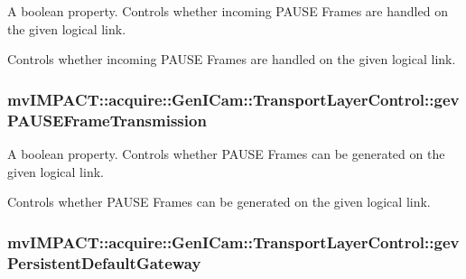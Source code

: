 A boolean property. Controls whether incoming P\+A\+U\+S\+E Frames are handled on the given logical link. 

Controls whether incoming P\+A\+U\+S\+E Frames are handled on the given logical link. \hypertarget{classmv_i_m_p_a_c_t_1_1acquire_1_1_gen_i_cam_1_1_transport_layer_control_a08688eb9f572aa6a47470b2371a45e43}{
\subsubsection[{gev\+P\+A\+U\+S\+E\+Frame\+Transmission}]{ mv\+I\+M\+P\+A\+C\+T\+::acquire\+::\+Gen\+I\+Cam\+::\+Transport\+Layer\+Control\+::gev\+P\+A\+U\+S\+E\+Frame\+Transmission}}\label{classmv_i_m_p_a_c_t_1_1acquire_1_1_gen_i_cam_1_1_transport_layer_control_a08688eb9f572aa6a47470b2371a45e43}


A boolean property. Controls whether P\+A\+U\+S\+E Frames can be generated on the given logical link. 

Controls whether P\+A\+U\+S\+E Frames can be generated on the given logical link. \hypertarget{classmv_i_m_p_a_c_t_1_1acquire_1_1_gen_i_cam_1_1_transport_layer_control_ae35c08fe9888c13ef3e608db00fdd73d}{
\subsubsection[{gev\+Persistent\+Default\+Gateway}]{ mv\+I\+M\+P\+A\+C\+T\+::acquire\+::\+Gen\+I\+Cam\+::\+Transport\+Layer\+Control\+::gev\+Persistent\+Default\+Gateway}}\label{classmv_i_m_p_a_c_t_1_1acquire_1_1_gen_i_cam_1_1_transport_layer_control_ae35c08fe9888c13ef3e608db00fdd73d}



